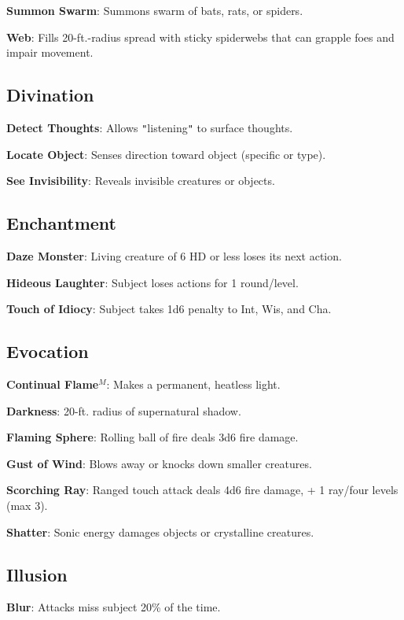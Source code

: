 \textbf{Summon Swarm}: Summons swarm of bats, rats, or spiders.

\textbf{Web}: Fills 20-ft.-radius spread with sticky spiderwebs that can grapple foes and impair movement.

\subsection{Divination}


\textbf{Detect Thoughts}: Allows \texttt{{}"{}}listening\texttt{{}"{}} to surface thoughts.

\textbf{Locate Object}: Senses direction toward object (specific or type).

\textbf{See Invisibility}: Reveals invisible creatures or objects.

\subsection{Enchantment}


\textbf{Daze Monster}: Living creature of 6 HD or less loses its next action.

\textbf{Hideous Laughter}: Subject loses actions for 1 round/level.

\textbf{Touch of Idiocy}: Subject takes 1d6 penalty to Int, Wis, and Cha.

\subsection{Evocation}


\textbf{Continual Flame}\(^{M}\): Makes a permanent, heatless light.

\textbf{Darkness}: 20-ft. radius of supernatural shadow.

\textbf{Flaming Sphere}: Rolling ball of fire deals 3d6 fire damage.

\textbf{Gust of Wind}: Blows away or knocks down smaller creatures.

\textbf{Scorching Ray}: Ranged touch attack deals 4d6 fire damage, + 1 ray/four levels (max 3).

\textbf{Shatter}: Sonic energy damages objects or crystalline creatures.

\subsection{Illusion}


\textbf{Blur}: Attacks miss subject 20\% of the time.

